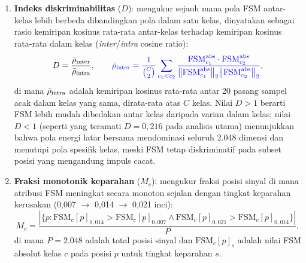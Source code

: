 \begin{enumerate}
  \item \textbf{Indeks diskriminabilitas} ($D$): mengukur sejauh mana pola
        FSM antar-kelas lebih berbeda dibandingkan pola dalam satu kelas,
        {\color{blue}dinyatakan sebagai rasio kemiripan kosinus rata-rata
        antar-kelas terhadap kemiripan kosinus rata-rata dalam kelas
        (\emph{inter}/\emph{intra} cosine ratio)}:%
        \begin{equation}\label{eq:bab3_discriminability}
          D = \frac{\bar{\rho}_{\rm inter}}{\bar{\rho}_{\rm intra}},
          \qquad
          {\color{blue}\bar{\rho}_{\rm inter} = \frac{1}{\binom{C}{2}}
            \sum_{c_1 < c_2}
            \frac{\mathrm{FSM}_{c_1}^{\rm abs} \cdot \mathrm{FSM}_{c_2}^{\rm abs}}
                 {\bigl\|\mathrm{FSM}_{c_1}^{\rm abs}\bigr\|_2
                  \bigl\|\mathrm{FSM}_{c_2}^{\rm abs}\bigr\|_2}},
        \end{equation}
        {\color{blue}di mana $\bar{\rho}_{\rm intra}$ adalah kemiripan
        kosinus rata-rata antar 20 pasang sampel acak dalam kelas yang sama,
        dirata-rata atas $C$ kelas. Nilai $D > 1$ berarti FSM lebih mudah
        dibedakan antar kelas daripada varian dalam kelas; nilai $D < 1$
        (seperti yang teramati $D = 0{,}216$ pada analisis utama) menunjukkan
        bahwa pola energi latar bersama mendominasi seluruh 2.048 dimensi dan
        menutupi pola spesifik kelas, meski FSM tetap diskriminatif pada
        subset posisi yang mengandung impuls cacat.}%

  \item \textbf{Fraksi monotonik keparahan} ($M_c$): mengukur fraksi posisi
        sinyal di mana atribusi FSM meningkat secara monoton sejalan dengan
        tingkat keparahan kerusakan (0,007 $\to$ 0,014 $\to$ 0,021 inci):
        \begin{equation}\label{eq:bab3_monotonicity}
          M_c = \frac{|\{p : \mathrm{FSM}_c[p]_{0{,}014}
                          > \mathrm{FSM}_c[p]_{0{,}007}
                        \wedge \mathrm{FSM}_c[p]_{0{,}021}
                          > \mathrm{FSM}_c[p]_{0{,}014}\}|}{P},
        \end{equation}
        di mana $P = 2.048$ adalah total posisi sinyal dan
        $\mathrm{FSM}_c[p]_s$ adalah nilai FSM absolut kelas $c$ pada posisi
        $p$ untuk tingkat keparahan $s$.


\end{enumerate}
